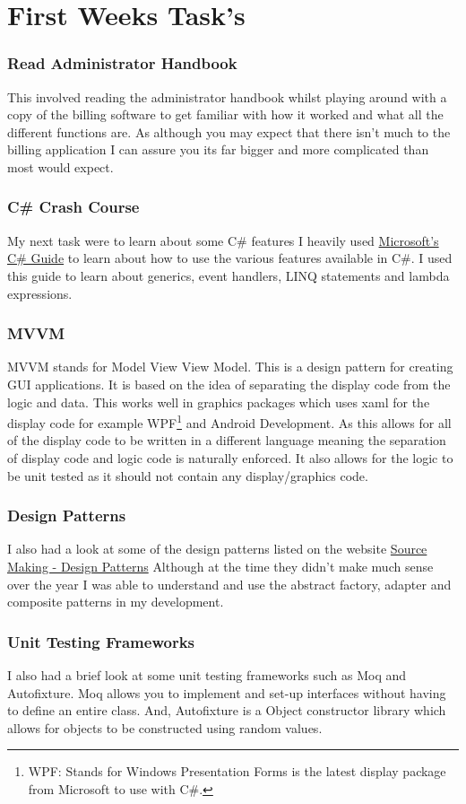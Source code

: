 \section{First Weeks Task's}{
	\subsubsection*{Read Administrator Handbook}{
		This involved reading the administrator handbook whilst playing around with a copy of the billing software to get familiar with how it worked and what all the different functions are. As although you may expect that there isn't much to the billing application I can assure you its far bigger and more complicated than most would expect.
	}
	\subsubsection*{C\# Crash Course}{
		My next task were to learn about some C\# features I heavily used \href{https://docs.microsoft.com/en-gb/dotnet/csharp/programming-guide/}{Microsoft's C\# Guide}\cite{CSProgrammingGuide2017} to learn about how to use the various features available in C\#. I used this guide to learn about generics, event handlers, LINQ statements and lambda expressions.
	}
	\subsubsection*{MVVM}{
		MVVM stands for Model View View Model. This is a design pattern for creating GUI applications. It is based on the idea of separating the display code from the logic and data. This works well in graphics packages which uses xaml for the display code for example WPF\footnote{WPF: Stands for Windows Presentation Forms is the latest display package from Microsoft to use with C\#.} and Android Development. As this allows for all of the display code to be written in a different language meaning the separation of display code and logic code is naturally enforced. It also allows for the logic to be unit tested as it should not contain any display/graphics code.
	}
	\subsubsection*{Design Patterns}{
		I also had a look at some of the design patterns listed on the website \href{https://sourcemaking.com/design_patterns}{Source Making - Design Patterns} \cite{DesignPatterns2007} Although at the time they didn't make much sense over the year I was able to understand and use the abstract factory, adapter and composite patterns in my development.
	}
	\subsubsection*{Unit Testing Frameworks}{
		I also had a brief look at some unit testing frameworks such as Moq and Autofixture. Moq allows you to implement and set-up interfaces without having to define an entire class. And, Autofixture is a Object constructor library which allows for objects to be constructed using random values.
	}
}